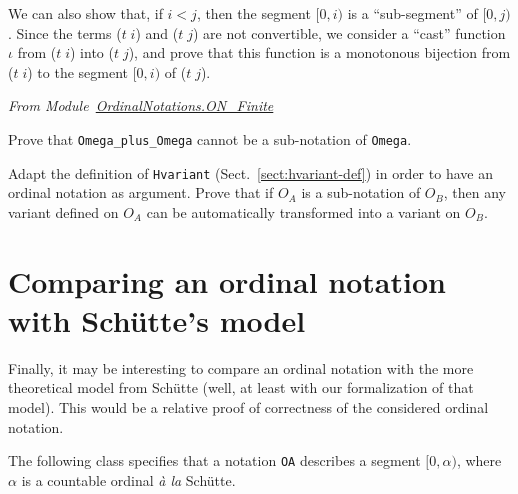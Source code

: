 

We can also show that, if $i<j$, then the segment $[0,i)$ is a ``sub-segment'' of
$[0,j)$. Since the terms  ($t\;i$) and ($t\;j$) are not convertible, we consider a ``cast'' 
function $\iota$ from ($t\;i$) into ($t\;j$), and prove that this function is  a monotonous bijection  from ($t\;i$) to
the segment $[0,i)$ of ($t\;j$).


\vspace{10pt}

\noindent\emph{From Module~\href{../theories/html/hydras.OrdinalNotations.ON_Finite.html}{OrdinalNotations.ON\_Finite}}





\begin{exercise}
Prove that \texttt{Omega\_plus\_Omega} cannot be a sub-notation of \texttt{Omega}.
\end{exercise}

\begin{project}
Adapt the definition of \texttt{Hvariant} (Sect.~\ref{sect:hvariant-def}) in order to
have an ordinal notation as argument. Prove that if $O_A$ is a sub-notation of $O_B$, then any variant defined on  $O_A$ can be automatically transformed into 
a variant on $O_B$.
\end{project}




\section{Comparing an ordinal notation with Schütte's model}

Finally, it may be interesting to compare an ordinal notation with the more theoretical model from Schütte (well, at least with our formalization of that model). This would be a relative proof of correctness of the considered  ordinal  notation.

The following class specifies that a notation \texttt{OA} describes a segment $[0,\alpha)$,
where $\alpha$ is a countable ordinal \emph{à la}  Schütte.


\label{types:ON-for}

